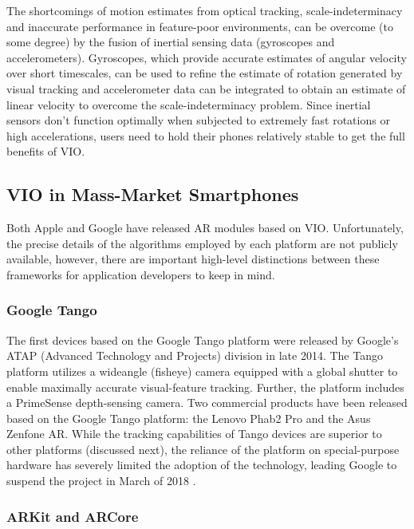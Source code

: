 \documentclass[chi_draft]{sigchi}
\begin{document}
The shortcomings of motion estimates from optical tracking, scale-indeterminacy and inaccurate performance in feature-poor environments, can be overcome (to some degree) by the fusion of inertial sensing data (gyroscopes and accelerometers).  Gyroscopes, which provide accurate estimates of angular velocity over short timescales, can be used to refine the estimate of rotation generated by visual tracking and accelerometer data can be integrated to obtain an estimate of linear velocity to overcome the scale-indeterminacy problem.  Since inertial sensors don't function optimally when subjected to extremely fast rotations or high accelerations, users need to hold their phones relatively stable to get the full benefits of VIO.

\subsection{VIO in Mass-Market Smartphones}
Both Apple and Google have released AR modules based on VIO.  Unfortunately, the precise details of the algorithms employed by each platform are not publicly available, however, there are important high-level distinctions between these frameworks for application developers to keep in mind.

\subsubsection{Google Tango}
The first devices based on the Google Tango platform were released by Google's ATAP (Advanced Technology and Projects) division in late 2014.  The Tango platform utilizes a wideangle (fisheye) camera equipped with a global shutter to enable maximally accurate visual-feature tracking.  Further, the platform includes a PrimeSense depth-sensing camera.  Two commercial products have been released based on the Google Tango platform: the Lenovo Phab2 Pro and the Asus Zenfone AR.  While the tracking capabilities of Tango devices are superior to other platforms (discussed next), the reliance of the platform on special-purpose hardware has severely limited the adoption of the technology, leading Google to suspend the project in March of 2018 \cite{tangoretired}.


\subsubsection{ARKit and ARCore}
\end{document}
